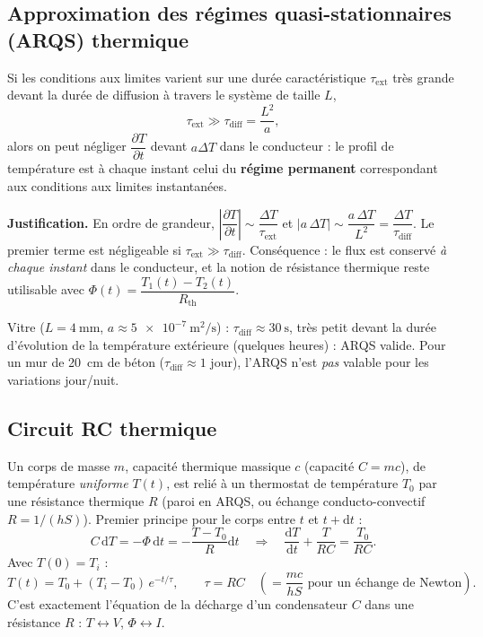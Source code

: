 \documentclass[11pt,a4paper]{article}
\newcommand{\dd}{\mathrm{d}}
\newcommand{\pd}[2]{\dfrac{\partial #1}{\partial #2}}
\begin{document}
\subsection{Approximation des régimes quasi-stationnaires (ARQS) thermique}

\begin{formule}[title={ARQS thermique}]
Si les conditions aux limites varient sur une durée caractéristique $\tau_{\text{ext}}$ très
grande devant la durée de diffusion à travers le système de taille $L$,
\[ \boxed{\tau_{\text{ext}}\gg\tau_{\text{diff}}=\dfrac{L^2}{a}}, \]
alors on peut négliger $\pd{T}{t}$ devant $a\Delta T$ dans le conducteur : le profil de
température est à chaque instant celui du \textbf{régime permanent} correspondant aux
conditions aux limites instantanées.
\end{formule}

\textbf{Justification.} En ordre de grandeur, $\left|\pd{T}{t}\right|\sim\dfrac{\Delta T}{\tau_{\text{ext}}}$
et $|a\,\Delta T|\sim\dfrac{a\,\Delta T}{L^2}=\dfrac{\Delta T}{\tau_{\text{diff}}}$. Le
premier terme est négligeable si $\tau_{\text{ext}}\gg\tau_{\text{diff}}$. Conséquence : le
flux est conservé \emph{à chaque instant} dans le conducteur, et la notion de résistance
thermique reste utilisable avec $\Phi(t)=\dfrac{T_1(t)-T_2(t)}{R_{\mathrm{th}}}$.

\begin{exemple}
Vitre ($L=\SI{4}{\milli\metre}$, $a\approx\SI{5e-7}{\square\metre\per\second}$) :
$\tau_{\text{diff}}\approx\SI{30}{\second}$, très petit devant la durée d'évolution de la
température extérieure (quelques heures) : ARQS valide. Pour un mur de \SI{20}{\centi\metre}
de béton ($\tau_{\text{diff}}\approx 1$ jour), l'ARQS n'est \emph{pas} valable pour les
variations jour/nuit.
\end{exemple}

\subsection{Circuit RC thermique}

\begin{demo}[title={Démonstration : refroidissement d'un corps (circuit RC thermique)}]
Un corps de masse $m$, capacité thermique massique $c$ (capacité $C=mc$), de température
\emph{uniforme} $T(t)$, est relié à un thermostat de température $T_0$ par une résistance
thermique $R$ (paroi en ARQS, ou échange conducto-convectif $R=1/(hS)$). Premier principe pour
le corps entre $t$ et $t+\dd t$ :
\[ C\,\dd T=-\Phi\,\dd t=-\dfrac{T-T_0}{R}\dd t
   \quad\Longrightarrow\quad
   \boxed{\dfrac{\dd T}{\dd t}+\dfrac{T}{RC}=\dfrac{T_0}{RC}}. \]
Avec $T(0)=T_i$ :
\[ T(t)=T_0+(T_i-T_0)\,e^{-t/\tau},\qquad \boxed{\tau=RC}
   \quad\left(=\dfrac{mc}{hS}\text{ pour un échange de Newton}\right). \]
C'est exactement l'équation de la décharge d'un condensateur $C$ dans une résistance $R$ :
$T\leftrightarrow V$, $\Phi\leftrightarrow I$.
\end{demo}
\end{document}
